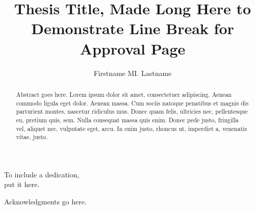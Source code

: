 \documentclass[11pt]{WSU_thesis}
\begin{document}
\title{Thesis Title, Made Long Here to Demonstrate Line Break for Approval Page}
\author{Firstname MI. Lastname}

\begin{frontmatter}

\maketitle
\approvalpage

\begin{abstract}
Abstract goes here. Lorem ipsum dolor sit amet, consectetuer adipiscing. Aenean 
commodo ligula eget dolor. Aenean massa. Cum sociis natoque penatibus et magnis 
dis parturient montes, nascetur ridiculus mus. Donec quam felis, ultricies nec, 
pellentesque eu, pretium quis, sem. Nulla consequat massa quis enim. Donec pede 
justo, fringilla vel, aliquet nec, vulputate eget, arcu. In enim justo, rhoncus 
ut, imperdiet a, venenatis vitae, justo.
\end{abstract}

\tableofcontents
\listoffigures
\listoftables
\newpage

\begin{dedication}
\null\vfil
{\large
\begin{center}
To include a dedication,\\\vspace{12pt}
put it here.
\end{center}}
\vfil\null
\end{dedication}


\begin{acknowledgements}
Acknowledgments go here.
\end{acknowledgements}

\end{frontmatter}
\doublespacing
\end{document}

